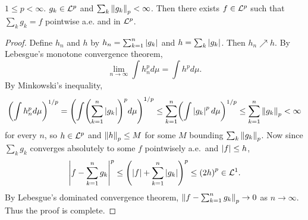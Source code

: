 \begin{lemma}\label{lem:r-f_sum}
    $1\leq p<\infty$. $g_k\in\mathcal{L}^p$ and $\sum_k \left\lVert {g_k} \right\rVert_p < \infty$. 
    Then there exists $f\in\mathcal{L}^p$ such that $\sum_k g_k = f$ pointwise 
    a.e. and in $\mathcal{L}^p$.
\end{lemma}
\begin{proof}
    Define $h_n$ and $h$ by $h_n = \sum_{k=1}^n\left\lvert {g_k} \right\rvert$ and 
    $h = \sum_k \left\lvert {g_k} \right\rvert$. Then $h_n\nearrow h$. By Lebesgue's 
    monotone convergence theorem, 
    \begin{equation*}
        \lim_{n\to\infty} \int h_n^pd\mu = \int h^pd\mu.
    \end{equation*} 
    By Minkowski's inequality, 
    \begin{equation*}
        \pth{\int h_n^pd\mu}^{1/p} = \pth{\int \pth{\sum_{k=1}^n\abs{g_k}}^pd\mu}^{1/p} 
        \leq \sum_{k=1}^n \pth{\int \abs{g_k}^pd\mu}^{1/p} 
        \leq \sum_{k=1}^n \norm{g_k}_p < \infty
    \end{equation*}
    for every $n$, so $h\in\mathcal{L}^p$ and $\left\lVert {h} \right\rVert_p \leq M$ for some $M$ bounding 
    $\sum_k \left\lVert {g_k} \right\rVert_p$. Now since $\sum_k g_k$ converges absolutely to some 
    $f$ pointwisely a.e.\ and $\left\lvert {f} \right\rvert\leq h$, 
    \begin{equation*}
        \abs{f - \sum_{k=1}^{n} g_k}^p \leq \pth{\abs{f} + \sum_{k=1}^{n}\abs{g_k}}^p 
        \leq \pth{2h}^p \in \L^1.
    \end{equation*}
    By Lebesgue's dominated convergence theorem, $\left\lVert {f-\sum_{k=1}^{n} g_k} \right\rVert_p\to 0$ 
    as $n\to\infty$. Thus the proof is complete.
\end{proof}

